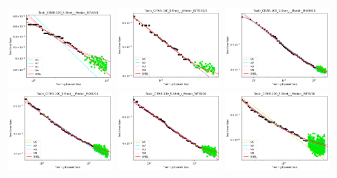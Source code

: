 \documentclass{article} %
\begin{document}
\clearpage
\begin{figure}
    \centering


\includegraphics[width=0.245\textwidth]{figures/scaling_laws_benchmark_dataset_plots__all_functional_forms/c100_5___BiT_50_1.png}
\includegraphics[width=0.245\textwidth]{figures/scaling_laws_benchmark_dataset_plots__all_functional_forms/c100_5___BiT_101_3.png}
\includegraphics[width=0.245\textwidth]{figures/scaling_laws_benchmark_dataset_plots__all_functional_forms/c100_5___MiX_B_16.png}
\includegraphics[width=0.245\textwidth]{figures/scaling_laws_benchmark_dataset_plots__all_functional_forms/c100_5___MiX_L_16.png}
\includegraphics[width=0.245\textwidth]{figures/scaling_laws_benchmark_dataset_plots__all_functional_forms/c100_5___ViT_B_16.png}
\includegraphics[width=0.245\textwidth]{figures/scaling_laws_benchmark_dataset_plots__all_functional_forms/c100_5___ViT_S_16.png}

\end{figure}
\end{document}
